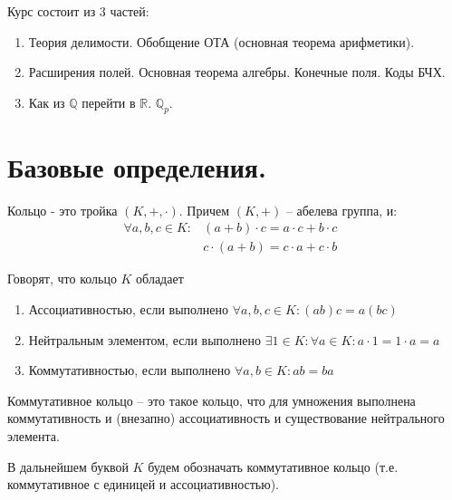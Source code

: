 \documentclass[document.tex]{subfiles}
\begin{document}
Курс состоит из 3 частей:
\begin{enumerate}
\item Теория делимости. Обобщение ОТА (основная теорема арифметики).
\item Расширения полей. Основная теорема алгебры. Конечные поля. Коды БЧХ.
\item Как из $\mathbb{Q}$ перейти в $\mathbb{R}$. $\mathbb{Q}_p$.
\end{enumerate}

\section{Базовые определения.}

\begin{definition}
Кольцо - это тройка $(K, +, \cdot)$. Причем $(K, +)$ -- абелева группа, и:
\begin{align*}
	\forall a, b, c \in K: &(a + b) \cdot c = a \cdot c + b \cdot c &	\\
			     		&c \cdot (a + b) = c \cdot a + c \cdot b
\end{align*}
\end{definition}

\begin{definition}
Говорят, что кольцо $K$ обладает 

\begin{enumerate}
	\item Ассоциативностью, если выполнено $\forall a, b, c \in K: (ab)c = a(bc)$
	\item Нейтральным элементом, если выполнено $\exists 1 \in K: \forall a \in K: a \cdot 1 = 1 \cdot a = a$
	\item Коммутативностью, если выполнено $\forall a, b \in K: ab = ba$
\end{enumerate}
\end{definition}

\begin{definition}
Коммутативное кольцо -- это такое кольцо, что для умножения выполнена коммутативность и (внезапно) ассоциативность и существование нейтрального элемента.
\end{definition}

\begin{remark}
В дальнейшем буквой $K$ будем обозначать коммутативное кольцо (т.е. коммутативное с единицей и ассоциативностью).
\end{remark}
\end{document}
